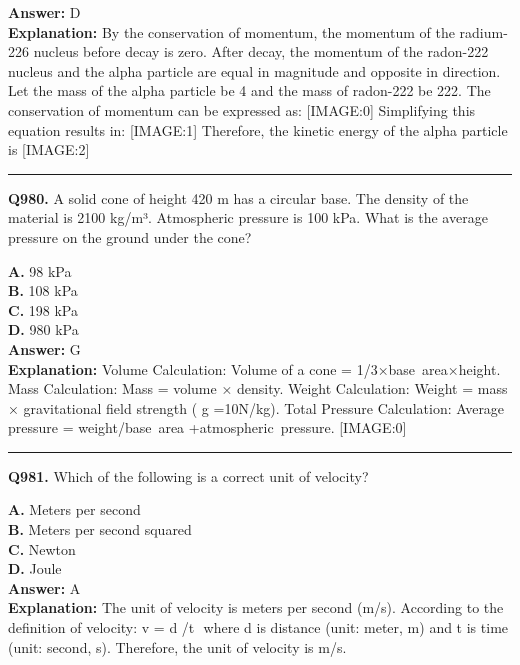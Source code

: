\documentclass[12pt]{article}
\begin{document}
\textbf{Answer:} D \\
\textbf{Explanation:} By the conservation of momentum, the momentum of the radium-226 nucleus before decay is zero. After decay, the momentum of the radon-222 nucleus and the alpha particle are equal in magnitude and opposite in direction. Let the mass of the alpha particle be 4 and the mass of radon-222 be 222. The conservation of momentum can be expressed as:
[IMAGE:0]
Simplifying this equation results in:
[IMAGE:1]
Therefore, the kinetic energy of the alpha particle is
[IMAGE:2]

\hrule
\vspace{1em}


\noindent
\textbf{Q980.} A solid cone of height 420 m has a circular base. The density of the material is 2100 kg/m³. Atmospheric pressure is 100 kPa. What is the average pressure on the ground under the cone?



\textbf{A.} 98 kPa \\
\textbf{B.} 108 kPa \\
\textbf{C.} 198 kPa \\
\textbf{D.} 980 kPa \\

\textbf{Answer:} G \\
\textbf{Explanation:} Volume Calculation: Volume of a cone = 1/3
​
×base area×height.
Mass Calculation: Mass = volume × density.
Weight Calculation: Weight = mass × gravitational field strength (
g
=10N/kg).
Total Pressure Calculation: Average pressure = weight/base area
​
+atmospheric pressure.
[IMAGE:0]

\hrule
\vspace{1em}


\noindent
\textbf{Q981.} Which of the following is a correct unit of velocity?



\textbf{A.} Meters per second \\
\textbf{B.} Meters per second squared \\
\textbf{C.} Newton \\
\textbf{D.} Joule \\

\textbf{Answer:} A \\
\textbf{Explanation:} The unit of velocity is meters per second (m/s). According to the definition of velocity:
v
=
d
/t
​
where
d
is distance (unit: meter, m) and
t
is time (unit: second, s). Therefore, the unit of velocity is m/s.
\end{document}
